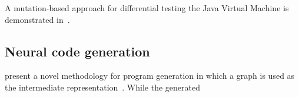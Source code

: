A mutation-based approach for differential testing the Java Virtual Machine is demonstrated in~\cite{Chena}.


\subsection{Neural code generation}

\citeauthor{Brockschmidt2018} present a novel methodology for program generation in which a graph is used as the intermediate representation~\cite{Brockschmidt2018}. While the generated 

